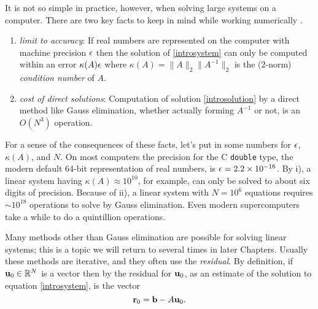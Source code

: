 It is not so simple in practice, however, when solving large systems on a computer.  There are two key facts to keep in mind while working numerically  \citep{TrefethenBau}.
\renewcommand{\labelenumi}{\roman{enumi})}
\begin{enumerate}
\item \emph{limit to accuracy}:  If real numbers are represented on the computer with machine precision $\epsilon$ then the solution of \eqref{introsystem} can only be computed within an error $\kappa(A) \epsilon$ where $\kappa(A) = \|A\|_2 \|A^{-1}\|_2$ is the (2-norm) \emph{condition number} of $A$.
\item \emph{cost of direct solutions}:  Computation of solution \eqref{introsolution} by a direct method like Gauss elimination, whether actually forming $A^{-1}$ or not, is an $O(N^3)$ operation.
\end{enumerate}

For a sense of the consequences of these facts, let's put in some numbers for $\epsilon$, $\kappa(A)$, and $N$.  On most computers the precision for the C \texttt{double} type, the modern default 64-bit representation of real numbers, is $\epsilon = 2.2 \times 10^{-16}$.  By i), a linear system having $\kappa(A) \approx 10^{10}$, for example, can only be solved to about six digits of precision.  Because of ii), a linear system with $N=10^6$ equations
requires $\sim 10^{18}$ operations to solve by Gauss elimination.  Even modern supercomputers take a while to do a quintillion operations.

Many methods other than Gauss elimination are possible for solving linear systems; this is a topic we will return to several times in later Chapters.  Usually these methods are iterative, and they often use the \emph{residual}.  By definition, if $\mathbf{u}_0\in \mathbb{R}^N$ is a vector then by the residual for $\mathbf{u}_0$, as an estimate of the solution to equation \eqref{introsystem}, is the vector
\begin{equation}
\mathbf{r}_0 = \mathbf{b} - A \mathbf{u}_0. \label{residualdefn}
\end{equation}

